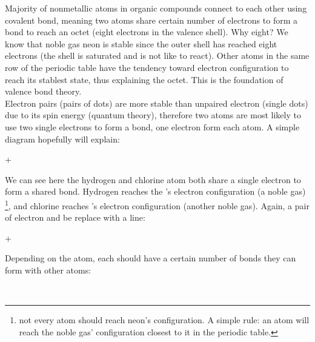 \documentclass{report}
\begin{document}
		Majority of nonmetallic atoms in organic compounds connect to each other using covalent bond, meaning two atoms share certain number of electrons to form a bond to reach an octet (eight electrons in the valence shell). Why eight? We know that noble gas neon  is stable since the outer shell has reached eight electrons (the shell is saturated and is not like to react). Other atoms in the same row of the periodic table have the tendency toward  electron configuration to reach its stablest state, thus explaining the octet. This is the foundation of valence bond theory. \\
		
		Electron pairs (pairs of dots) are more stable than unpaired electron (single dots) due to its spin energy (quantum theory), therefore two atoms are most likely to use two single electrons to form a bond, one electron form each atom. A simple diagram hopefully will explain:
		\begin{center}		
			 \qquad
			+ \qquad
			 \qquad
			\ch{->} \qquad
			 
		\end{center}
		
		We can see here the hydrogen and chlorine atom both share a single electron to form a shared bond. Hydrogen reaches the 's electron configuration (a noble gas) \footnote{not every atom should reach neon's configuration. A simple rule: an atom will reach the noble gas' configuration closest to it in the periodic table.}, and chlorine reaches 's electron configuration (another noble gas). Again, a pair of electron and be replace with a line:
		\begin{center}
			 \qquad
			+ \qquad
			 \qquad
			\ch{->} \qquad
		\end{center}
		
		Depending on the atom, each should have a certain number of bonds they can form with other atoms:
		\begin{center}
			 \hfill
			 \hfill
			 \\
			
			 \hfill
		\end{center}
		
\end{document}
